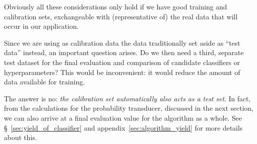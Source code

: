 \documentclass[\ifafour a4paper,12pt,\else a5paper,10pt,\fi%
onecolumn,oneside,article,%
british%
]{memoir}
\makeatletter
\theoremstyle{remark}
\theoremstyle{innote}
\def\sum{\DOTSI\sumop\slimits@}
\newcommand*{\amp}{\&}
\newcommand*{\pencil}{{\fontencoding{U}\fontfamily{fontawesometwo}\selectfont\symbol{210}}}
\newcommand{\mynotep}[1]{{\footnotesize\color{notecolour}\pencil\ #1}}
\renewcommand*{\P}{\mathrm{P}}%
\renewcommand*{\|}[1][]{\nonscript\:#1\vert\nonscript\:\mathopen{}}
\newcommand*{\sect}{\S}%
\newcommand*{\texts}[1]{\text{\small #1}}
\makeatother
\begin{document}
Obviously all these considerations only hold if we have good training and calibration sets, exchangeable with (representative of) the real data that will occur in our application.


\medskip

Since we are using as calibration data the data traditionally set aside as \enquote{test data} instead, an important question arises. Do we then need a third, separate test dataset for the final evaluation and comparison of candidate classifiers or hyperparameters? This would be inconvenient: it would reduce the amount of data available for training.

The answer is no: \emph{the calibration set automatically also acts as a test set}. In fact, from the calculations for the probability transducer, discussed in the next section, we can also arrive at a final evaluation value for the algorithm as a whole. See \sect~\ref{sec:yield_of_classifier} and appendix~\ref{sec:algorithm_yield} for more details about this.
\end{document}
